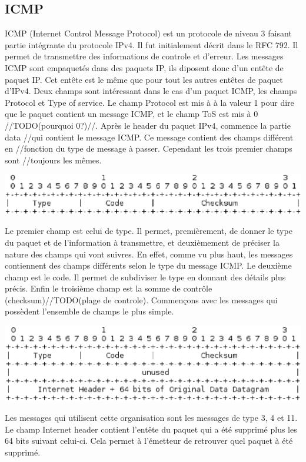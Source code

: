 \subsection{ICMP} ICMP (Internet Control Message Protocol) est un protocole de
niveau 3 faisant partie intégrante du protocole IPv4. Il fut initialement
décrit dans le RFC 792\cite{url-RFC-ICMP}.
Il permet de transmettre des informations de controle et d'erreur. Les messages
ICMP sont empaquetés dans des paquets IP, ils diposent donc d'un entête de
paquet IP. Cet entête est le même que pour tout les autres entêtes de paquet
d'IPv4. Deux champs sont intéressant dans le cas d'un paquet ICMP, les champs
Protocol et Type of service. Le champ Protocol est mis à à la valeur 1 pour
dire que le paquet contient un message ICMP, et le champ ToS est mis à 0
//TODO(pourquoi 0?)//.  Après le header du paquet IPv4, commence la partie data
//qui contient le message ICMP. Ce message contient des champs différent en
//fonction du type de message à passer. Cependant les trois premier champs sont
//toujours les mêmes.

\includegraphics[width=15cm]{./pics/header.eps}

Le premier champ est celui de type. Il permet, premièrement, de donner le type
du paquet et de l'information à transmettre, et deuxièmement de préciser la
nature des champs qui vont suivres. En effet, comme vu plus haut, les messages
contiennent des champs différents selon le type du message ICMP.
Le deuxième champ est le code. Il permet de subdiviser le type en donnant des détails plus
précis. Enfin le troisième champ est la somme de contrôle
(checksum)//TODO(plage de controle).  Commençons avec les messages qui
possèdent l'ensemble de champs le plus simple.

\includegraphics[width=15cm]{./pics/header1.eps}

Les messages qui utilisent cette organisation sont les messages de type 3, 4
et 11.
Le champ Internet header contient l'entête du paquet qui a été supprimé plus
les 64 bits suivant celui-ci. Cela permet à l'émetteur de retrouver quel paquet
à été supprimé.


